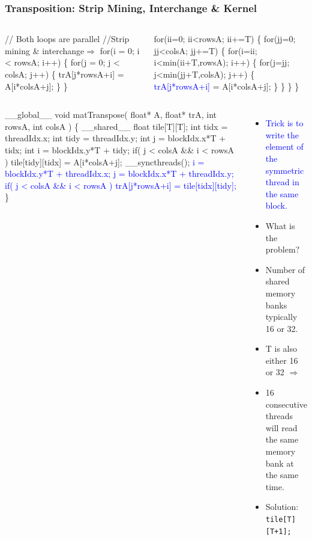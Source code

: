 \documentclass{beamer}
\newcommand{\blue}[1]{\textcolor{Blue}{{#1}}}
\renewcommand{\emph}[1]{\textcolor{structure}{#1}}
\newcommand{\emp}[1]{\textcolor{DikuRed}{ #1}}
\newcommand{\emphh}[1]{\textcolor{CosGreen}{ #1}}
\newcommand{\mymath}[1]{$ #1 $}
\begin{document}
\begin{frame}[fragile,t]
  \frametitle{Transposition: Strip Mining, Interchange \& Kernel} 
\vspace{-1ex}
\begin{columns}
\begin{colorcode}[fontsize=\scriptsize]
//\emphh{Both loops are parallel}
//Strip mining \& interchange\mymath{\Rightarrow}
for(i = 0; i < rowsA; i++) \{    
  for(j = 0; j < colsA; j++) \{ 
    trA[j*rowsA+i] = A[i*colsA+j];
\} \}
\end{colorcode}
\begin{colorcode}[fontsize=\scriptsize]
\emp{for(ii=0; ii<rowsA; ii+=T) \{}
  \emp{for(jj=0; jj<colsA; jj+=T) \{}
    \emphh{for(i=ii; i<min(ii+T,rowsA); i++) \{}
      \emphh{for(j=jj; j<min(jj+T,colsA); j++) \{}
        \blue{trA[j*rowsA+i]} = A[i*colsA+j];
\} \} \} \}
\end{colorcode}
\end{columns}

\pause

\begin{columns}
\begin{colorcode}[fontsize=\scriptsize]
__global__ void matTranspose(
        float* A,  float* trA, 
        int rowsA, int colsA  ) \{
  __shared__ float tile[T][\alert{T}];
  int tidx = threadIdx.x;
  int tidy = threadIdx.y;
  int j    = blockIdx.x*T + tidx;
  int i    = blockIdx.y*T + tidy;
  if( j < colsA && i < rowsA )
    tile[tidy][tidx] = A[i*colsA+j];
  __syncthreads();
  \blue{i = blockIdx.y*T + threadIdx.x;} 
  \blue{j = blockIdx.x*T + threadIdx.y;}
  \blue{if( j < colsA && i < rowsA )}
    \blue{trA[j*rowsA+i] = tile[tidx]\alert{[tidy]};}
\}
\end{colorcode}
\begin{itemize}
    \item \blue{Trick is to write the element of the symmetric thread in the same block.}
    \item \alert{What is the problem?}\pause
    \item Number of shared memory banks typically 16 or 32.
    \item T is also either 16 or 32 $\Rightarrow$
    \item 16 consecutive threads will read the same 
            memory bank at the same time.
    \item \emph{Solution: {\tt tile[T][\alert{T+1}];} }
\end  {itemize}
\end{columns}

\end{frame}
\end{document}
